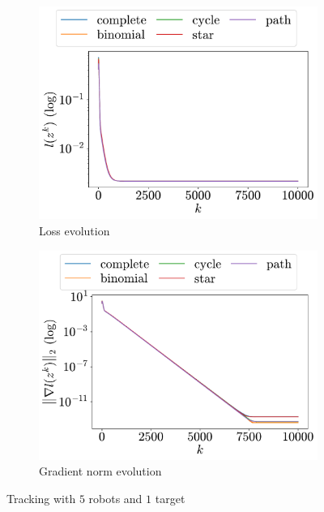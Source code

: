 \documentclass[a4paper,11pt,oneside]{book}
\begin{document}
\begin{figure}[H]
      \centering
      \begin{subfigure}[t]{0.48\linewidth}
            \centering
            \includegraphics[width=\linewidth]{./figs/tracking/5_1_2/loss.pdf} 
            \caption{Loss evolution}
      \end{subfigure}
      \hfill
      \begin{subfigure}[t]{0.48\linewidth}
            \centering
            \includegraphics[width=\linewidth]{./figs/tracking/5_1_2/gradient.pdf} 
            \caption{Gradient norm evolution}
      \end{subfigure}
      \caption{Tracking with $5$ robots and $1$ target}
      \label{fig:tracking_5_1}
\end{figure}
\end{document}
